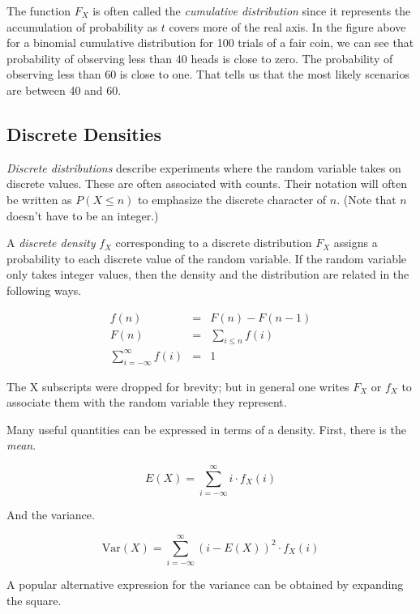 \documentclass[]{article}
\begin{document}
The function $F_X$ is often called the
\emph{cumulative distribution} since it represents the
accumulation of probability as $t$ covers more of the
real axis.  In the figure above for a binomial
cumulative distribution for 100 trials of a fair coin,
we can see that probability of observing less than 40
heads is close to zero.  The probability of observing
less than 60 is close to one.  That tells us that the
most likely scenarios are between 40 and 60.

\subsection{Discrete Densities}

\emph{Discrete distributions} describe experiments where the
random variable takes on discrete values.  These are
often associated with counts.  Their notation will often
be written as $P(X \le n)$ to emphasize the discrete character
of $n$. (Note that $n$ doesn't have to be an integer.)

A \emph{discrete density} $f_X$ corresponding to a discrete
distribution $F_X$ assigns a probability to each discrete value
of the random variable.  If the random variable only takes
integer values, then the density and the distribution
are related in the following ways.

\begin{eqnarray*}
f(n) & = & F(n) - F(n-1)\\
F(n) & = & \sum_{i \le n} f(i)\\
\sum_{i=-\infty}^{\infty} f(i) & = & 1
\end{eqnarray*}

The X subscripts were dropped for brevity; but in general
one writes $F_X$ or $f_X$ to associate them with the random
variable they represent.

Many useful quantities can be expressed in terms of a density.
First, there is the \emph{mean}.

\begin{equation} \label{discrete_mean}
E(X) = \sum_{i = -\infty}^{\infty} i \cdot f_X(i)
\end{equation}

And the variance.

\begin{equation} \label{discrete_var1}
\mbox{Var}(X) = \sum_{i = -\infty}^{\infty} (i - E(X))^2 \cdot f_X(i)
\end{equation}

A popular alternative expression for the variance can be
obtained by expanding the square.
\end{document}
